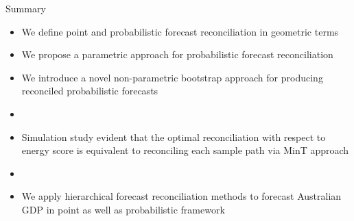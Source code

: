 \documentclass[11pt,xcolor=dvipsnames,handout]{beamer} %
\begin{document}
\begin{frame}[noframenumbering]{Summary}
	\begin{itemize}[<+-| alert@+>]
		\item We define point and probabilistic forecast reconciliation in geometric terms
		\item We propose a parametric approach for probabilistic forecast reconciliation 
		
		\item We introduce a novel non-parametric bootstrap approach for producing reconciled probabilistic forecasts
		\item[]
		\item Simulation study evident that the optimal reconciliation with respect to energy score is equivalent to reconciling each sample path via MinT approach
		\item[]
		\item We apply hierarchical forecast reconciliation methods to forecast Australian GDP in point as well as probabilistic framework
		
	\end{itemize}
\end{frame}
\end{document}

